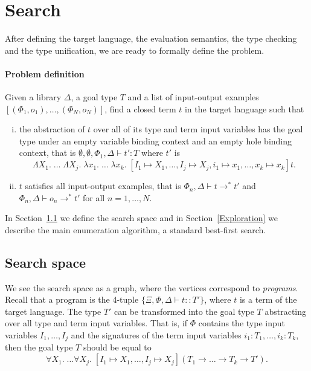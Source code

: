 \section{Search}
After defining the target language, the evaluation semantics, the type checking and the type unification, we are ready to formally define the problem.

\paragraph{Problem definition} Given a library $\Delta$, a goal type $T$ and a list of input-output examples $[(\Phi_1, o_1), \ldots , (\Phi_N, o_N)]$, find a closed term $t$ in the target language such that
\begin{enumerate}[(i)]
\item the abstraction of $t$ over all of its type and term input variables has the goal type under an empty variable binding context and an empty hole binding context, that is $\emptyset, \emptyset, \Phi_1, \Delta \vdash t' : T$ where $t'$ is \[\Lambda X_1.\; \ldots\; \Lambda X_j.\; \lambda x_1.\; \ldots\; \lambda x_k.\; [I_1 \mapsto X_1, \ldots, I_j \mapsto X_j, i_1 \mapsto x_1, \ldots, x_k \mapsto x_k]t.\]
\item $t$ satisfies all input-output examples, that is $\Phi_n, \Delta \vdash t \longrightarrow^* t'$ and $\Phi_n, \Delta \vdash o_n \longrightarrow^* t'$ for all $n = 1, \ldots, N$.
\end{enumerate}

In Section~\ref{Search space} we define the search space and in Section~\ref{Exploration} we describe the main enumeration algorithm, a standard best-first search.

\subsection{Search space}\label{Search space}
We see the search space as a graph, where the vertices correspond to \emph{programs}. Recall that a program is the 4-tuple $\{\Xi, \Phi, \Delta \vdash t :: T'\}$, where $t$ is a term of the target language. The type $T'$ can be transformed into the goal type $T$ abstracting over all type and term input variables. That is, if $\Phi$ contains the type input variables $I_1, \ldots, I_j$ and the signatures of the term input variables $i_1 : T_1, \ldots, i_k : T_k$, then the goal type $T$ should be equal to
\[\forall X_1.\; \ldots \forall X_j.\; [I_1 \mapsto X_1, \ldots, I_j \mapsto X_j] (T_1 \rightarrow \ldots \rightarrow T_k \rightarrow T').\]

